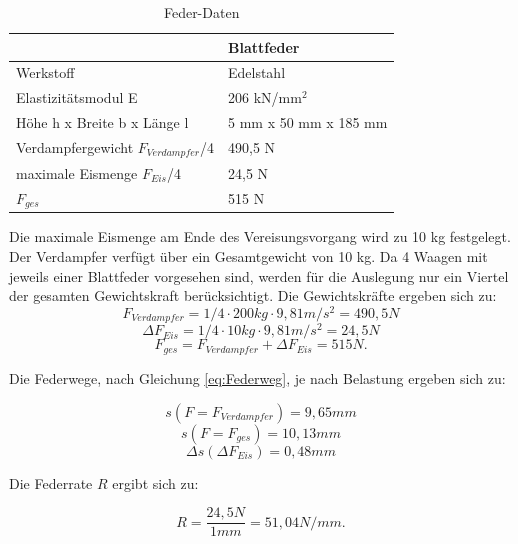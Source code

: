  
\begin{table}[htb]
\centering
\caption{Feder-Daten}\vspace{6pt}
\begin{tabular}{ll}
\hline 
 & \textbf{Blattfeder}  \\ 
\hline 
\hline 
Werkstoff & Edelstahl\\
\hline 
Elastizitätsmodul E & 206 kN/mm$^2$ \\ 
\hline 
Höhe h x Breite b x Länge l & 5 mm x 50 mm x 185 mm\\
\hline
Verdampfergewicht $F_{Verdampfer}$/4 & 490,5 N\\
\hline
maximale Eismenge $F_{Eis}$/4 & 24,5 N\\
\hline
$F_{ges}$ & 515 N\\
\hline
\hline
\end{tabular} 
\label{tab:Federblattereigenschaften}
\end{table}

Die maximale Eismenge am Ende des Vereisungsvorgang wird zu 10 kg festgelegt. Der Verdampfer verfügt über ein Gesamtgewicht von 10 kg. Da 4 Waagen mit jeweils einer Blattfeder vorgesehen sind, werden für die Auslegung nur ein Viertel der gesamten Gewichtskraft berücksichtigt.  Die Gewichtskräfte ergeben sich zu:
\begin{equation*}
F_{Verdampfer}= 1/4\cdot 200 kg \cdot 9,81 m/s^2 = 490,5 N
\end{equation*}
\begin{equation*}
\Delta F_{Eis}= 1/4 \cdot 10 kg \cdot 9,81 m/s^2 = 24,5 N
\end{equation*}
\begin{equation*}
F_{ges}= F_{Verdampfer} + \Delta F_{Eis} = 515 N.
\end{equation*}

Die Federwege, nach Gleichung \ref{eq:Federweg}, je nach Belastung ergeben sich zu:

\begin{equation*}
  s(F= F_{Verdampfer})=9,65 mm 
 \end{equation*}
 \begin{equation*}
 s(F= F_{ges})= 10,13 mm 
 \end{equation*}
\begin{equation*}
 \Delta s(\Delta F_{Eis}) = 0,48 mm
\end{equation*}

Die Federrate $R$ ergibt sich zu:

\begin{equation*}
R = \frac{24,5 N}{1 mm} = 51,04 N/mm.
\end{equation*}

